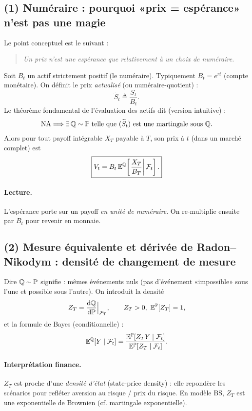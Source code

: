 
\subsection*{(1) Numéraire : pourquoi «prix = espérance» n'est pas une magie}
Le point conceptuel est le suivant :
\begin{quote}
\emph{Un prix n'est une espérance que relativement à un choix de numéraire.}
\end{quote}
Soit $B_t$ un actif strictement positif (le numéraire). Typiquement $B_t=e^{rt}$ (compte monétaire).
On définit le prix \emph{actualisé} (ou numéraire-quotient) :
\[
\widetilde S_t \triangleq \frac{S_t}{B_t}.
\]
Le théorème fondamental de l'évaluation des actifs dit (version intuitive) :
\[
\text{NA} \Longrightarrow \exists\,\mathbb{Q}\sim\mathbb{P} \text{ telle que } (\widetilde S_t) \text{ est une martingale sous }\mathbb{Q}.
\]
Alors pour tout payoff intégrable $X_T$ payable à $T$, son prix à $t$ (dans un marché complet) est
\[
\boxed{
V_t = B_t\,\mathbb{E}^{\mathbb{Q}}\!\left[\left.\frac{X_T}{B_T}\right|\mathcal{F}_t\right].
}
\]
\paragraph{Lecture.}
L'espérance porte sur un payoff \emph{en unité de numéraire}. On re-multiplie ensuite par $B_t$ pour revenir en monnaie.

\subsection*{(2) Mesure équivalente et dérivée de Radon--Nikodym : densité de changement de mesure}
Dire $\mathbb{Q}\sim\mathbb{P}$ signifie : mêmes événements nuls (pas d'événement «impossible» sous l'une et possible sous l'autre).
On introduit la densité
\[
Z_T=\frac{\mathrm{d} \mathbb{Q}}{\mathrm{d} \mathbb{P}}\Big|_{\mathcal{F}_T},
\qquad Z_T>0,\ \mathbb{E}^{\mathbb{P}}[Z_T]=1,
\]
et la formule de Bayes (conditionnelle) :
\[
\mathbb{E}^{\mathbb{Q}}[Y\mid \mathcal{F}_t]
=\frac{\mathbb{E}^{\mathbb{P}}[Z_T Y\mid \mathcal{F}_t]}{\mathbb{E}^{\mathbb{P}}[Z_T\mid \mathcal{F}_t]}.
\]
\paragraph{Interprétation finance.}
$Z_T$ est proche d'une \emph{densité d'état} (state-price density) : elle repondère les scénarios pour refléter aversion au risque / prix du risque.
En modèle BS, $Z_T$ est une exponentielle de Brownien (cf. martingale exponentielle).

